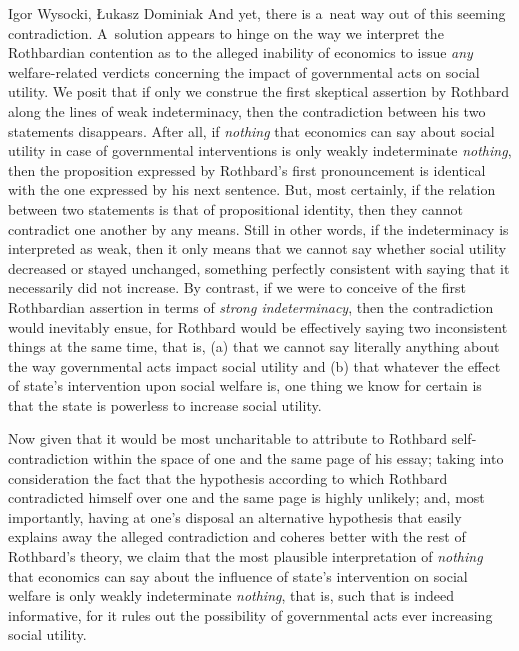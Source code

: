 \begin{artengenv}{Igor Wysocki, Łukasz Dominiak}
And yet, there is a~neat way out of this seeming contradiction. A~solution appears to hinge on the way we interpret the Rothbardian contention as to the alleged inability of economics to issue \textit{any} welfare-related verdicts concerning the impact of governmental acts on social utility. We posit that if only we construe the first skeptical assertion by Rothbard along the lines of weak indeterminacy, then the contradiction between his two statements disappears. After all, if \textit{nothing} that economics can say about social utility in case of governmental interventions is only weakly indeterminate \textit{nothing}, then the proposition expressed by Rothbard's first pronouncement is identical with the one expressed by his next sentence. But, most certainly, if the relation between two statements is that of propositional identity, then they cannot contradict one another by any means. Still in other words, if the indeterminacy is interpreted as weak, then it only means that we cannot say whether social utility decreased or stayed unchanged, something perfectly consistent with saying that it necessarily did not increase. By contrast, if we were to conceive of the first Rothbardian assertion in terms of \textit{strong indeterminacy}, then the contradiction would inevitably ensue, for Rothbard would be effectively saying two inconsistent things at the same time, that is, (a) that we cannot say literally anything about the way governmental acts impact social utility and (b) that whatever the effect of state's intervention upon social welfare is, one thing we know for certain is that the state is powerless to increase social utility.



Now given that it would be most uncharitable to attribute to Rothbard self-contradiction within the space of one and the same page of his essay; taking into consideration the fact that the hypothesis according to which Rothbard contradicted himself over one and the same page is highly unlikely; and, most importantly, having at one's disposal an alternative hypothesis that easily explains away the alleged contradiction and coheres better with the rest of Rothbard's theory, we claim that the most plausible interpretation of \textit{nothing} that economics can say about the influence of state's intervention on social welfare is only weakly indeterminate \textit{nothing}, that is, such that is indeed informative, for it rules out the possibility of governmental acts ever increasing social utility.




\end{artengenv}
